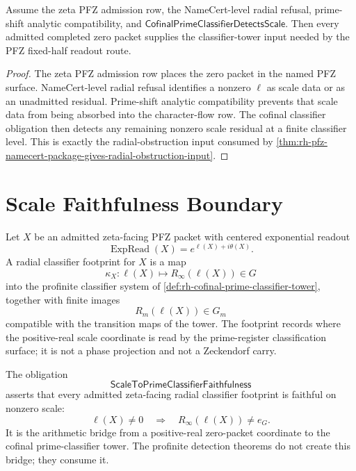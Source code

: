 \begin{corollary}
\label{cor:rh-classifier-tower-input-for-fixed-half-readout}
Assume the zeta PFZ admission row, the NameCert-level radial refusal,
prime-shift analytic compatibility, and
$\mathsf{CofinalPrimeClassifierDetectsScale}$.  Then every admitted
completed zero packet supplies the classifier-tower input needed by the
PFZ fixed-half readout route.
\end{corollary}

\begin{proof}
The zeta PFZ admission row places the zero packet in the named PFZ
surface.  NameCert-level radial refusal identifies a nonzero $\ell$ as
scale data or as an unadmitted residual.  Prime-shift analytic
compatibility prevents that scale data from being absorbed into the
character-flow row.  The cofinal classifier obligation then detects any
remaining nonzero scale residual at a finite classifier level.  This is
exactly the radial-obstruction input consumed by
\autoref{thm:rh-pfz-namecert-package-gives-radial-obstruction-input}.
\end{proof}

\section{Scale Faithfulness Boundary}
\label{sec:rh-smooth-prime-scale-faithfulness-boundary}

\begin{definition}
\label{def:rh-radial-classifier-footprint}
Let $X$ be an admitted zeta-facing PFZ packet with centered exponential
readout
$$
\operatorname{ExpRead}(X)=e^{\ell(X)+i\theta(X)}.
$$
A radial classifier footprint for $X$ is a map
$$
\kappa_X:\ell(X)\longmapsto R_{\infty}(\ell(X))\in G
$$
into the profinite classifier system of
\autoref{def:rh-cofinal-prime-classifier-tower}, together with finite
images
$$
R_m(\ell(X))\in G_m
$$
compatible with the transition maps of the tower.  The footprint records
where the positive-real scale coordinate is read by the prime-register
classification surface; it is not a phase projection and not a
Zeckendorf carry.
\end{definition}

\begin{definition}[ScaleToPrimeClassifierFaithfulness]
\label{def:rh-scale-to-prime-classifier-faithfulness}
The obligation
$$
\mathsf{ScaleToPrimeClassifierFaithfulness}
$$
asserts that every admitted zeta-facing radial classifier footprint is
faithful on nonzero scale:
$$
\ell(X)\ne0
\quad\Longrightarrow\quad
R_{\infty}(\ell(X))\ne e_G.
$$
It is the arithmetic bridge from a positive-real zero-packet coordinate
to the cofinal prime-classifier tower.  The profinite detection theorems
do not create this bridge; they consume it.
\end{definition}

